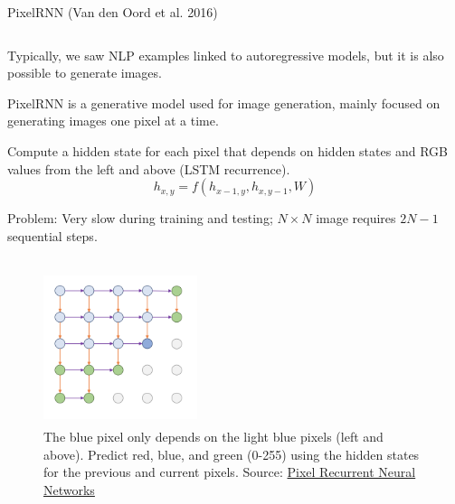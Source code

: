 \documentclass[9pt]{beamer}
\begin{document}
\begin{frame}{PixelRNN (Van den Oord et al. 2016)}
  \begin{column}{0.50\textwidth}
        \begin{itemsize}
            \item Typically, we saw NLP examples linked to autoregressive models, but it is also possible to generate images.
            \vspace{0.1cm}
            \item PixelRNN is a generative model used for image generation, mainly focused on generating images one pixel at a time.
            \vspace{0.1cm}
            \item Compute a hidden state for each pixel that depends on hidden states and RGB values from the left and above (LSTM recurrence). 
            $$
            h_{x,y}=f(h_{x-1, y}, h_{x,y-1}, W)
            $$
            \vspace{0.1cm}
            \item Problem: Very slow during training and testing; $N\times N$ image requires $2N-1$ sequential steps.
        \end{itemsize}
    \end{column}
    \begin{column}{0.50\textwidth}
        \begin{figure}
            \centering
            \includegraphics[width = 4.5cm, height=4.5cm]{diapositivas/img/pixelrnn.png}
            \caption{The blue pixel only depends on the light blue pixels (left and above). Predict red, blue, and green (0-255) using the hidden states for the previous and current pixels. Source: \href{https://arxiv.org/abs/1601.06759}{Pixel Recurrent Neural Networks}}
            \label{fig:enter-label}
        \end{figure}
    \end{column}
\end{frame}
\end{document}
